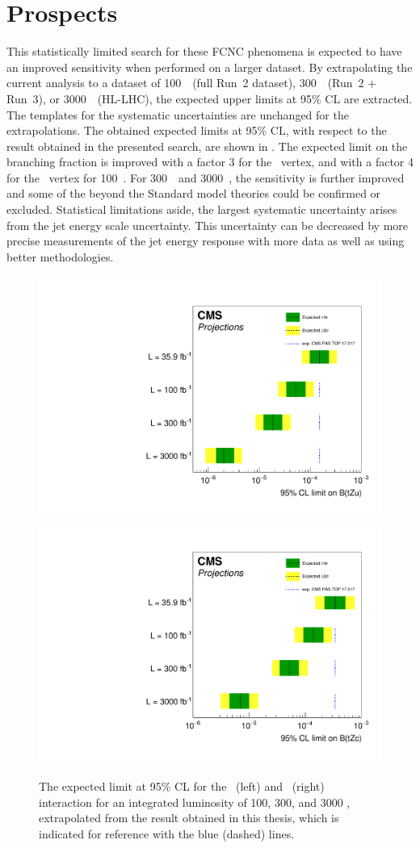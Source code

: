 \section{Prospects}
This statistically limited search for these FCNC phenomena is expected to have an improved sensitivity when performed on a larger dataset. By extrapolating the current analysis to a dataset of 100~\fbinv\ (full Run~2 dataset), 300~\fbinv\ (Run~2 + Run~3), or 3000~\fbinv\ (HL-LHC), the expected upper limits at 95\% CL are  extracted. %
The templates for the systematic uncertainties are unchanged for the extrapolations. The obtained expected limits at 95\% CL, with respect to the result obtained in the presented search, are shown in .  The expected limit on the branching fraction is improved with a factor  3 for the \Zut\ vertex, and with a factor  4 for the \Zct\ vertex for 100~\fbinv. For 300~\fbinv\ and 3000~\fbinv, the sensitivity is further improved and some of the beyond the Standard model theories could be confirmed or excluded. Statistical limitations aside, the largest systematic uncertainty arises from the jet energy scale uncertainty. This uncertainty can be decreased by more precise measurements of the jet energy response with more data as well as using better methodologies. %
\begin{figure}[htbp]
	\centering
	\includegraphics[width=0.49\linewidth]{7_Conclusion/Figures/TOP-17-017_limitsZutProj.pdf}
	\includegraphics[width=0.49\linewidth]{7_Conclusion/Figures/TOP-17-017_limitsZctproj.pdf}
	\caption{The expected limit at 95\% CL for the \Zut\ (left) and \Zct\ (right) interaction for an integrated luminosity of 100, 300, and 3000 \fbinv, extrapolated from the result obtained in this thesis, which is indicated for reference with the blue (dashed) lines. }
	\label{fig:proj} %
\end{figure}


